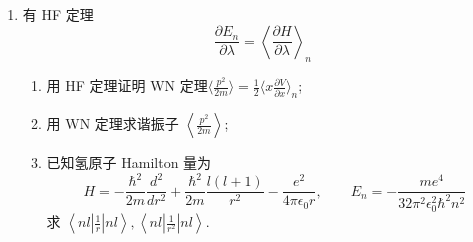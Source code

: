 \begin{enumerate}
{\begin{enumerate}
		\item 手征为 $1$ 时 $\xi=\eta\equiv\phi(x)$，$E=0$ 的定态方程为
		\begin{align*}
			H\begin{pmatrix}\phi\\\phi\end{pmatrix}=\begin{pmatrix}m(x)\phi-\phi'\\\phi'-m(x)\phi\end{pmatrix}=0
		\end{align*}
		即 $\frac{d\phi}{dx}=m(x)\phi=-M\tanh\!\left(\frac{x}{x_0}\right)\phi$。分离变量并积分（利用提示）：
		\begin{align*}
			\ln\phi=-M\int\tanh\!\left(\frac{x}{x_0}\right)dx=-Mx_0\ln\cosh\!\left(\frac{x}{x_0}\right)+C
		\end{align*}
			得 $\phi(x)=A\left[\cosh\!\left(\frac{x}{x_0}\right)\right]^{-Mx_0}$。令 $\kappa=Mx_0>0$，由
			\[
			2|A|^2\int_{-\infty}^{+\infty}\!\left[\cosh\!\left(\frac{x}{x_0}\right)\right]^{-2\kappa}dx=1
			\]
			可取
			\[
			A=\left[\frac{\Gamma(\kappa+\tfrac12)}{2x_0\sqrt\pi\,\Gamma(\kappa)}\right]^{1/2}.
			\]
			故归一化零能态为
		\begin{align*}
			\psi(x)=A\begin{pmatrix}\left[\cosh\left(\frac{x}{x_0}\right)\right]^{-Mx_0}\\\left[\cosh\left(\frac{x}{x_0}\right)\right]^{-Mx_0}\end{pmatrix}
		\end{align*}
	\end{enumerate}
	
}



\newpage
\item 
有 HF 定理
\[
\frac{\partial E_n}{\partial \lambda}=\left\langle\frac{\partial H}{\partial \lambda}\right\rangle_n
\]
\begin{enumerate}
	\item
用 HF 定理证明 WN 定理$ \langle\frac{p^2}{2 m}\rangle=\frac{1}{2}\langle x \frac{\partial V}{\partial x}\rangle_n $;
\item 
用 WN 定理求谐振子 $\left\langle\frac{p^2}{2 m}\right\rangle$;
\item 
已知氢原子 Hamilton 量为
\[
H=-\frac{\hbar^2}{2 m} \frac{d^2}{d r^2}+\frac{\hbar^2}{2 m} \frac{l(l+1)}{r^2}-\frac{e^2}{4 \pi \epsilon_0 r},  \qquad E_n= -\frac{m e^4}{32 \pi^2 \epsilon_0^2 \hbar^2 n^2}
\]
求 $\left\langle n l\left|\frac{1}{r}\right| n l\right\rangle,\left\langle n l\left|\frac{1}{r^2}\right| n l\right\rangle$.
\end{enumerate}


\end{enumerate}
